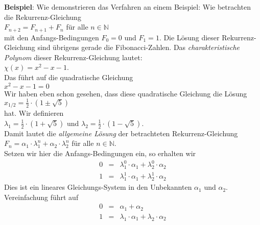 \noindent
\textbf{Beispiel}:  Wie demonstrieren das Verfahren an einem Beispiel: Wie betrachten die
Rekurrenz-Gleichung \\[0.2cm]
\hspace*{1.3cm} $F_{n+2} = F_{n+1} + F_{n}$ \quad f\"{u}r alle $n \in \mathbb{N}$  \\[0.2cm]
mit den Anfangs-Bedingungen $F_0 = 0$ und $F_1 = 1$.  Die L\"{o}sung dieser
Rekurrenz-Gleichung sind \"{u}brigens gerade die Fibonacci-Zahlen.
Das \emph{charakteristische Polynom} dieser Rekurrenz-Gleichung lautet: \\[0.2cm]
\hspace*{1.3cm} $\chi(x) = x^2 - x - 1$.  \\[0.2cm]
Das f\"{u}hrt auf die quadratische Gleichung \\[0.2cm]
\hspace*{1.3cm} $x^2 -x - 1 = 0$ \\[0.2cm]
Wir haben eben schon gesehen, dass diese quadratische Gleichung die L\"{o}sung \\[0.2cm]
\hspace*{1.3cm}
 $ x_{1/2} = \frac{1}{2} \cdot (1 \pm \sqrt{5})$ 
\\[0.2cm]
hat.  Wir definieren \\[0.2cm]
\hspace*{1.3cm} 
$\lambda_1 = \frac{1}{2} \cdot (1 + \sqrt{5})$ \quad und  \quad 
$\lambda_2 = \frac{1}{2} \cdot (1 - \sqrt{5})$. \\[0.2cm]
Damit lautet die \emph{allgemeine L\"{o}sung} der betrachteten Rekurrenz-Gleichung \\[0.2cm]
\hspace*{1.3cm}  $F_n = \alpha_1 \cdot \lambda_1^n  + \alpha_2 \cdot \lambda_2^n$ \quad f\"{u}r alle $n \in \mathbb{N}$. \\[0.2cm]
Setzen wir hier die Anfangs-Bedingungen ein, so erhalten wir
\[
\begin{array}{lcl}
    0 & = & \lambda_1^0 \cdot \alpha_1 + \lambda_2^0   \cdot \alpha_2 \\[0.2cm]
    1 & = & \lambda_1^1 \cdot \alpha_1 + \lambda_2^{1} \cdot \alpha_2 
\end{array}
\]
Dies ist ein lineares Gleichungs-System in den Unbekannten $\alpha_1$ und
$\alpha_2$. Vereinfachung f\"{u}hrt auf 
\[
\begin{array}{lcl}
    0 & = & \alpha_1 + \alpha_2 \\[0.2cm]
    1 & = & \lambda_1 \cdot \alpha_1 + \lambda_2 \cdot \alpha_2 
\end{array}
\]
